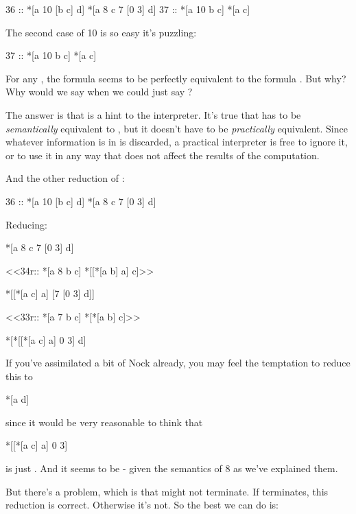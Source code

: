 \begin{code}
36 ::    *[a 10 [b c] d]  *[a 8 c 7 [0 3] d]
37 ::    *[a 10 b c]      *[a c]
\end{code}
The second case of 10 is so easy it's puzzling:

\begin{code}
37 ::    *[a 10 b c]      *[a c]
\end{code}
For any , the formula \kode{[10 b c]} seems to be perfectly
equivalent to the formula .  But why?  Why would we say
\kode{[10 b c]} when we could just say ?

The answer is that  is a hint to the interpreter.  It's true
that \kode{[10 b c]} has to be \emph{semantically} equivalent to , but
it doesn't have to be \emph{practically} equivalent.  Since whatever
information is in  is discarded, a practical interpreter is
free to ignore it, or to use it in any way that does not affect
the results of the computation.

And the other reduction of :

\begin{code}
    36 ::    *[a 10 [b c] d]  *[a 8 c 7 [0 3] d]
\end{code}
Reducing:

\begin{code}
*[a 8 c 7 [0 3] d]

  <<34r::    *[a 8 b c]       *[[*[a b] a] c]>>

*[[*[a c] a] [7 [0 3] d]]

  <<33r::    *[a 7 b c]       *[*[a b] c]>>

*[*[[*[a c] a] 0 3] d]
\end{code}
If you've assimilated a bit of Nock already, you may feel the
temptation to reduce this to

\begin{code}
*[a d]
\end{code}
since it would be very reasonable to think that

\begin{code}
*[[*[a c] a] 0 3]
\end{code}

is just .  And it seems to be - given the semantics of 8 as
we've explained them.

But there's a problem, which is that  might not terminate.
If  terminates, this reduction is correct.  Otherwise it's not.
So the best we can do is:

